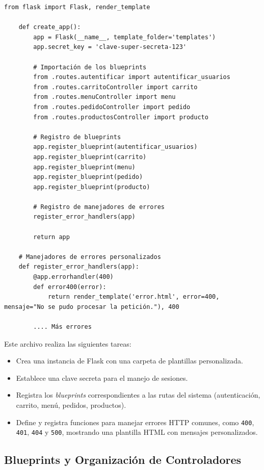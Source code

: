 \documentclass[10pt]{book}
\begin{document}
    \begin{lstlisting}[style=pythonclean, caption={Inicialización de la aplicación Flask}]
    from flask import Flask, render_template
    
    def create_app():
        app = Flask(__name__, template_folder='templates')
        app.secret_key = 'clave-super-secreta-123'
        
        # Importación de los blueprints
        from .routes.autentificar import autentificar_usuarios
        from .routes.carritoController import carrito
        from .routes.menuController import menu
        from .routes.pedidoController import pedido
        from .routes.productosController import producto
    
        # Registro de blueprints
        app.register_blueprint(autentificar_usuarios)
        app.register_blueprint(carrito)
        app.register_blueprint(menu)
        app.register_blueprint(pedido)
        app.register_blueprint(producto)
    
        # Registro de manejadores de errores
        register_error_handlers(app)
    
        return app
    
    # Manejadores de errores personalizados
    def register_error_handlers(app):
        @app.errorhandler(400)
        def error400(error):
            return render_template('error.html', error=400, mensaje="No se pudo procesar la petición."), 400
    
        .... Más errores
    \end{lstlisting}
    
    Este archivo realiza las siguientes tareas:
    
    \begin{itemize}
      \item Crea una instancia de Flask con una carpeta de plantillas personalizada.
      \item Establece una clave secreta para el manejo de sesiones.
      \item Registra los \textit{blueprints} correspondientes a las rutas del sistema (autenticación, carrito, menú, pedidos, productos).
      \item Define y registra funciones para manejar errores HTTP comunes, como \texttt{400}, \texttt{401}, \texttt{404} y \texttt{500}, mostrando una plantilla HTML con mensajes personalizados.
    \end{itemize}
\subsection{Blueprints y Organización de Controladores}
\end{document}
